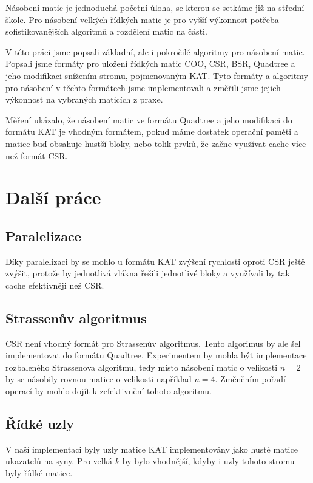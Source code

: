 \documentclass[thesis=B,czech]{FITthesis}[2012/06/26]
\begin{document}
\begin{conclusion}

Násobení matic je jednoduchá početní úloha, se kterou se setkáme již na střední škole. Pro násobení velkých řídkých matic je pro vyšší výkonnost potřeba  sofistikovanějších algoritmů a rozdělení matic na části.

V této práci jsme popsali základní, ale i pokročilé algoritmy pro násobení matic. Popsali jsme formáty pro uložení řídkých matic COO, CSR, BSR, Quadtree a jeho modifikaci snížením stromu, pojmenovaným KAT. Tyto formáty a algoritmy pro násobení v těchto formátech jsme implementovali a změřili jsme jejich výkonnost na vybraných maticích z praxe.

Měření ukázalo, že násobení matic ve formátu Quadtree a jeho modifikaci do formátu KAT je vhodným formátem, pokud máme dostatek operační paměti a matice buď obsahuje hustší bloky, nebo tolik prvků, že začne využívat cache více než formát CSR.

\section{Další práce}

\subsection{Paralelizace}

Díky paralelizaci by se mohlo u formátu KAT zvýšení rychlosti oproti CSR ještě zvýšit, protože by jednotlivá vlákna řešili jednotlivé bloky a využívali by tak cache efektivněji než CSR. 

\subsection{Strassenův algoritmus}

CSR není vhodný formát pro Strassenův algoritmus. Tento algorimus by ale šel implementovat do formátu Quadtree. Experimentem by mohla být implementace rozbaleného Strassenova algoritmu, tedy místo násobení matic o velikosti $n = 2$ by se násobily rovnou matice o velikosti například $n = 4$. Změněním pořadí operací by mohlo dojít k zefektivnění tohoto algoritmu. 

\subsection{Řídké uzly}
	
V naší implementaci byly uzly matice KAT implementovány jako husté matice ukazatelů na syny. Pro velká $k$ by bylo vhodnější, kdyby i uzly tohoto stromu byly řídké matice.	
	
\end{conclusion}
\end{document}
